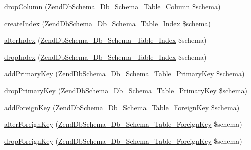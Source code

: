 \begin{DoxyCompactItemize}
\hyperlink{interfaceZendDbSchema__Db__Schema__Generator__Interface_a188139ee0beaaefa6682aa085032066f}{drop\-Column} (\hyperlink{classZendDbSchema__Db__Schema__Table__Column}{\-Zend\-Db\-Schema\-\_\-\-Db\-\_\-\-Schema\-\_\-\-Table\-\_\-\-Column} \$schema)
\item 
\hyperlink{interfaceZendDbSchema__Db__Schema__Generator__Interface_a552dd781001712d1b32aa4502a183667}{create\-Index} (\hyperlink{classZendDbSchema__Db__Schema__Table__Index}{\-Zend\-Db\-Schema\-\_\-\-Db\-\_\-\-Schema\-\_\-\-Table\-\_\-\-Index} \$schema)
\item 
\hyperlink{interfaceZendDbSchema__Db__Schema__Generator__Interface_afab23dedfbf324bc85c7ab6987347a08}{alter\-Index} (\hyperlink{classZendDbSchema__Db__Schema__Table__Index}{\-Zend\-Db\-Schema\-\_\-\-Db\-\_\-\-Schema\-\_\-\-Table\-\_\-\-Index} \$schema)
\item 
\hyperlink{interfaceZendDbSchema__Db__Schema__Generator__Interface_a511718fcf136852bb083e34b5be6de68}{drop\-Index} (\hyperlink{classZendDbSchema__Db__Schema__Table__Index}{\-Zend\-Db\-Schema\-\_\-\-Db\-\_\-\-Schema\-\_\-\-Table\-\_\-\-Index} \$schema)
\item 
\hyperlink{interfaceZendDbSchema__Db__Schema__Generator__Interface_aec1966e5bb34543cef031c3e262b1e61}{add\-Primary\-Key} (\hyperlink{classZendDbSchema__Db__Schema__Table__PrimaryKey}{\-Zend\-Db\-Schema\-\_\-\-Db\-\_\-\-Schema\-\_\-\-Table\-\_\-\-Primary\-Key} \$schema)
\item 
\hyperlink{interfaceZendDbSchema__Db__Schema__Generator__Interface_a1e4cb058601c920bd9276af26396c663}{drop\-Primary\-Key} (\hyperlink{classZendDbSchema__Db__Schema__Table__PrimaryKey}{\-Zend\-Db\-Schema\-\_\-\-Db\-\_\-\-Schema\-\_\-\-Table\-\_\-\-Primary\-Key} \$schema)
\item 
\hyperlink{interfaceZendDbSchema__Db__Schema__Generator__Interface_a3fb3373d818831770e2f0b3231c00fba}{add\-Foreign\-Key} (\hyperlink{classZendDbSchema__Db__Schema__Table__ForeignKey}{\-Zend\-Db\-Schema\-\_\-\-Db\-\_\-\-Schema\-\_\-\-Table\-\_\-\-Foreign\-Key} \$schema)
\item 
\hyperlink{interfaceZendDbSchema__Db__Schema__Generator__Interface_a0a8707fa08289cbba6b8d7bf08e23b47}{alter\-Foreign\-Key} (\hyperlink{classZendDbSchema__Db__Schema__Table__ForeignKey}{\-Zend\-Db\-Schema\-\_\-\-Db\-\_\-\-Schema\-\_\-\-Table\-\_\-\-Foreign\-Key} \$schema)
\item 
\hyperlink{interfaceZendDbSchema__Db__Schema__Generator__Interface_a702317a271f73bc0009ccc44cc90b975}{drop\-Foreign\-Key} (\hyperlink{classZendDbSchema__Db__Schema__Table__ForeignKey}{\-Zend\-Db\-Schema\-\_\-\-Db\-\_\-\-Schema\-\_\-\-Table\-\_\-\-Foreign\-Key} \$schema)
\end{DoxyCompactItemize}


